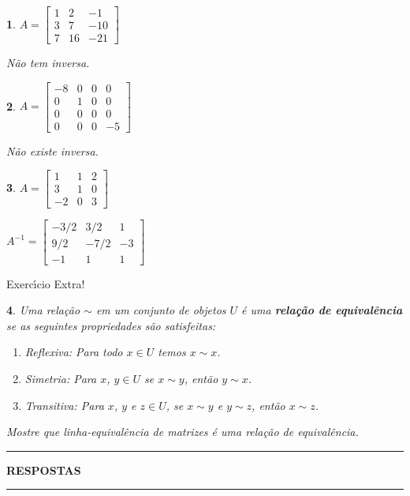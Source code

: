 \documentclass[12pt]{exam}
\newtheorem{exercicio}{}
\begin{document}
\begin{exercicio}
$A =\begin{bmatrix}
    1 & 2 & -1\\
    3 & 7 & -10\\
    7 & 16 & -21
  \end{bmatrix}$
\begin{solucao}
  N\~ao tem inversa.
\end{solucao}
\end{exercicio}

\begin{exercicio}
$A =\begin{bmatrix}
    -8 & 0 & 0 & 0\\
    0 & 1 & 0 & 0\\
    0 & 0 & 0 & 0\\
    0 & 0 & 0 & -5
  \end{bmatrix}$
\begin{solucao}
 N\~ao existe inversa.
\end{solucao}
\end{exercicio}

\begin{exercicio}\label{matrizinversafim}
$A =\begin{bmatrix}
    1 & 1 & 2\\
    3 & 1 & 0\\
    -2 & 0 & 3
  \end{bmatrix}$
\begin{solucao}
  $A^{-1} =\begin{bmatrix}
    -3/2 & 3/2 & 1\\
    9/2 & -7/2 & -3\\
    -1 & 1 & 1
  \end{bmatrix}$
\end{solucao}
\end{exercicio}

\begin{center}
  Exerc{\'\i}cio Extra!
\end{center}
\begin{exercicio}
  Uma rela\c{c}\~ao $\sim$ em um conjunto de objetos $U$ \'e uma \textbf{rela\c{c}\~ao de equival\^encia} se as seguintes propriedades s\~ao satisfeitas:
  \begin{enumerate}
    \item \textit{Reflexiva}: Para todo $x \in U$ temos $x \sim x$.
    \item \textit{Simetria}: Para $x$, $y \in U$ se $x \sim y$, ent\~ao $y \sim x$.
    \item \textit{Transitiva}: Para $x$, $y$ e $z \in U$, se $x \sim y$ e $y \sim z$, ent\~ao $x \sim z$.
  \end{enumerate}
  Mostre que linha-equival\^encia de matrizes \'e uma rela\c{c}\~ao de equival\^encia.
\end{exercicio}

\newpage
{}
\hrule
\begin{center}
{\large\bf RESPOSTAS}
\end{center}
\hrule

\end{document}
